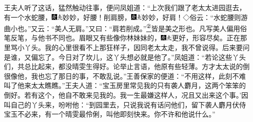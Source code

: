 王夫人听了这话，猛然触动往事，便问凤姐道：``上次我们跟了老太太进园逛去，有一个水蛇腰，{\includegraphics[width=3mm]{../Images/00004}\includegraphics[width=3mm]{../Images/00012}\footnotesize \kaishu 妙妙，好腰！}削肩膀，{\includegraphics[width=3mm]{../Images/00004}\includegraphics[width=3mm]{../Images/00012}\footnotesize \kaishu 妙妙，好肩！◇俗云：``水蛇腰则游曲小也。''又云：``美人无肩。''又曰：``肩若削成。''}\href{../Text/part0078_split_000.html\#lnkback_2_a}{\textsuperscript{②}}{皆是美之形也。凡写美人偏用俗笔反笔，与他书不同也。}眉眼又有些像你林妹妹的，{\includegraphics[width=3mm]{../Images/00004}\includegraphics[width=3mm]{../Images/00012}\footnotesize \kaishu 更好，形容尽矣。}正在那里骂小丫头。我的心里很看不上那狂样子，因同老太太走，我不曾说得。后来要问是谁，又偏忘了。今日对了坎儿，这丫头想必就是他了。''凤姐道：``若论这些丫头们，共总比起来，都没晴雯生得好。论举止言语，他原有些轻薄。方才太太说的倒很像他，我也忘了那日的事，不敢乱说。''王善保家的便道：``不用这样，此刻不难叫了他来太太瞧瞧。''王夫人道：``宝玉房里常见我的只有袭人麝月，这两个笨笨的倒好。若有这个，他自不敢来见我的。我一生最嫌这样人，况且又出来这个事。'因叫自己的丫头来，吩咐他：``到园里去，只说我说有话问他们，留下袭人麝月伏侍宝玉不必来，有一个晴雯最伶俐，叫他即刻快来。你不许和他说什么。''

